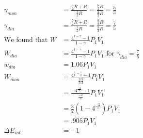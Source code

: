 	\begin{align*}
	\gamma_{mon}&=\frac{\frac{3}{2}R+R}{\frac{3}{2}R}=\frac{\frac{5}{2}R}{\frac{3}{2}R}=\frac{5}{3}\\
	\gamma_{dia}&=\frac{\frac{5}{2}R+R}{\frac{5}{2}R}=\frac{\frac{9}{2}R}{\frac{5}{2}R}=\frac{7}{5}\\
	\text{We found that } W&=\frac{4^{1-\gamma}-1}{1-\gamma}P_1V_1\\
	W_{dia}&=\frac{4^{1-\gamma}-1}{1-\gamma}P_1V_1 \text{ for } \gamma_{dia}=\frac{7}{5}\\
	w_{dia}&=1.06P_1V_1\\
	W_{mon}&=\frac{4^{\frac{3}{3}-\frac{5}{3}}-1}{\frac{3}{3}\frac{5}{3}}P_1V_1\\
	&=\frac{-4^{\frac{-2}{3}}-1}{\frac{-2}{3}}P_1V_1\\
	&=\frac{3}{2}\left(1-4^{\frac{-2}{3}}\right)P_1V_1\\
	&=.905P_1V_1\\
	\Delta{}E_{int}&=-1\\
	\end{align*}
